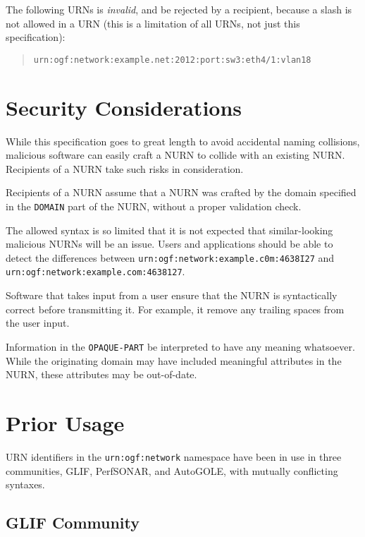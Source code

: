 \documentclass[12pt]{article}  %
\begin{document}
The following URNs is \emph{invalid}, and \MUST{} be rejected by a recipient, 
because a slash is not allowed in a URN (this is a limitation of all URNs, 
not just this specification):
\begin{quote}
\texttt{urn:ogf:network:example.net:2012:port:sw3:eth4/1:vlan18}
\end{quote}





\section{Security Considerations}

While this specification goes to great length to avoid accidental naming collisions,
malicious software can easily craft a NURN to collide with an existing NURN. 
Recipients of a NURN \MUST{} take such risks in consideration.

Recipients of a NURN \MUSTNOT{} assume that a NURN was crafted by the domain
specified in the \texttt{DOMAIN} part of the NURN, without a proper validation 
check.

The allowed syntax is so limited that it is not expected that similar-looking 
malicious NURNs will be an issue. Users and applications should be able to detect the 
differences between \texttt{urn:ogf:network:example.c0m:4638I27} 
and \texttt{urn:ogf:network:example.com:4638127}.

Software that takes input from a user \MUST{} ensure that the NURN is 
syntactically correct before transmitting it. For example, it \SHOULD{} remove any 
trailing spaces from the user input.

Information in the \texttt{OPAQUE-PART} \MUSTNOT{} be interpreted to have 
any meaning whatsoever. While the originating domain may have included 
meaningful attributes in the NURN, these attributes may be out-of-date.

\section{Prior Usage}

URN identifiers in the \texttt{urn:ogf:network} namespace have been in use in 
three communities, GLIF, PerfSONAR, and AutoGOLE, with mutually conflicting syntaxes.

\subsection{GLIF Community} %
\label{sec:glif}
\end{document}

